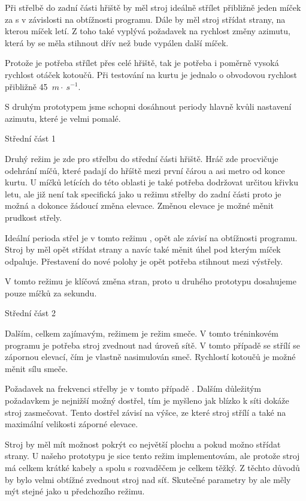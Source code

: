 Při střelbě do zadní části hřiště by měl stroj ideálně střílet přibližně jeden míček za  s v závislosti na obtížnosti programu. Dále by měl stroj střídat strany, na kterou míček letí. Z toho také vyplývá požadavek na rychlost změny azimutu, která by se měla stihnout dřív než bude vypálen další míček. 

Protože je potřeba střílet přes celé hřiště, tak je potřeba i poměrně vysoká rychlost otáček kotoučů. Při testování na kurtu je jednalo o obvodovou rychlost přibližně 45~$m\cdot~s^{-1}$. 

S druhým prototypem jsme schopni dosáhnout periody  hlavně kvůli nastavení azimutu, které je velmi pomalé. 

\sec Střední část 1

Druhý režim je zde pro střelbu do střední části hřiště. Hráč zde procvičuje odehrání míčů, které padají do hříště mezi první čárou a asi metro od konce kurtu. U míčků letících do této oblasti je také potřeba dodržovat určitou křivku letu, ale již není tak specifická jako u režimu střelby do zadní části proto je možná a dokonce žádoucí změna elevace. Změnou elevace je možné měnit prudkost střely.

Ideální perioda střel je v tomto režimu , opět ale závisí na obtížnosti programu. Stroj by měl opět střídat strany a navíc také měnit úhel pod kterým míček odpaluje. Přestavení do nové polohy je opět potřeba stihnout mezi výstřely. 

V tomto režimu je klíčová změna stran, proto u druhého prototypu dosahujeme pouze  míčků za sekundu.

\sec Střední část 2
 
Dalším, celkem zajímavým, režimem je režim smeče. V tomto tréninkovém programu je potřeba stroj zvednout nad úroveň sítě. V tomto případě se střílí se zápornou elevací, čím je vlastně nasimulován smeč. Rychlostí kotoučů je možné měnit sílu smeče. 

Požadavek na frekvenci střelby je v tomto případě . Dalším důležitým požadavkem je nejnižší možný dostřel, tím je myšleno jak blízko k síti dokáže stroj zasmečovat. Tento dostřel závisí na výšce, ze které stroj střílí a také na maximální velikosti záporné elevace. 

Stroj by měl mít možnost pokrýt co největší plochu a pokud možno střídat strany. U našeho prototypu je sice tento režim implementovám, ale protože stroj má celkem krátké kabely a spolu s rozvaděčem je celkem těžký. Z těchto důvodů by bylo velmi obtížné zvednout stroj nad síť. Skutečné parametry by ale měly mýt stejné jako u předchozího režimu.
 

